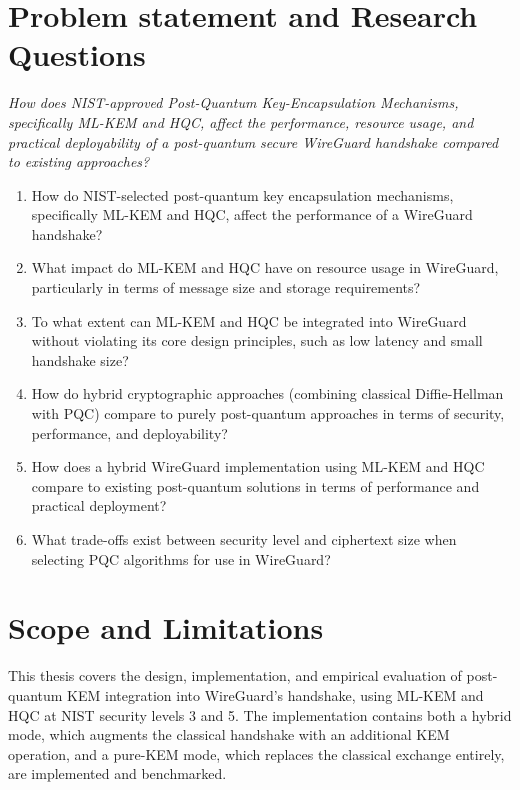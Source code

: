 \section{Problem statement and Research Questions}\label{research_questions}
\textit{How does NIST-approved Post-Quantum Key-Encapsulation Mechanisms, specifically ML-KEM and HQC, affect the performance, resource usage, and practical deployability of a post-quantum secure WireGuard handshake compared to existing  approaches?}

\begin{enumerate}[label=\textbf{RQ\arabic*.}]
    \item How do NIST-selected post-quantum key encapsulation mechanisms, specifically ML-KEM and HQC, affect the performance of a WireGuard handshake?

    \item What impact do ML-KEM and HQC have on resource usage in WireGuard, particularly in terms of message size and storage requirements?

    \item To what extent can ML-KEM and HQC be integrated into WireGuard without violating its core design principles, such as low latency and small handshake size?

    \item How do hybrid cryptographic approaches (combining classical Diffie-Hellman with PQC) compare to purely post-quantum approaches in terms of security, performance, and deployability?

    \item How does a hybrid WireGuard implementation using ML-KEM and HQC compare to existing post-quantum solutions in terms of performance and practical deployment?

    \item What trade-offs exist between security level and ciphertext size when selecting PQC algorithms for use in WireGuard?
\end{enumerate}

\section{Scope and Limitations} 
This thesis covers the design, implementation, and empirical evaluation of post-quantum KEM integration into WireGuard's handshake, using ML-KEM and HQC at NIST security levels 3 and 5. The implementation contains both a hybrid mode, which augments the classical handshake with an additional KEM operation, and a pure-KEM mode, which replaces the classical exchange entirely, are implemented and benchmarked. 

